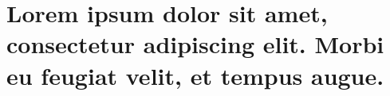 \documentclass[
	aspectratio=169, %
	12pt, %
	t, %
]{beamer}
\begin{document}

\section{Lorem ipsum dolor sit amet, consectetur adipiscing elit. Morbi eu feugiat velit, et tempus augue.}


\closingslide %

\end{document}
